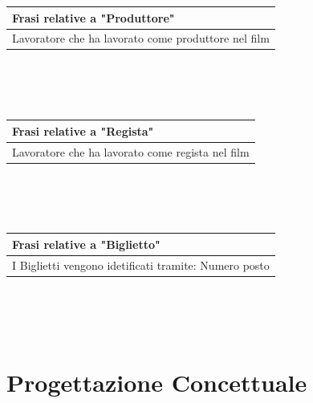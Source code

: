 \documentclass[10pt]{article}
\begin{document}
	\begin{tabular} { |p{16.8cm}| }
		\hline
		\rowcolor{lightgray}
		\textbf{Frasi relative a "Produttore"} \\
		\hline
		Lavoratore che ha lavorato come produttore nel film \\
		\hline 		
	\end{tabular} 
	\\\\\\
	\begin{tabular} { |p{16.8cm}| }
		\hline
		\rowcolor{lightgray}
		\textbf{Frasi relative a "Regista"} \\
		\hline
		Lavoratore che ha lavorato come regista nel film \\
		\hline 		
	\end{tabular} 
	\\\\\\
	\begin{tabular} { |p{16.8cm}| }
		\hline
		\rowcolor{lightgray}
		\textbf{Frasi relative a "Biglietto"} \\
		\hline
		I Biglietti vengono idetificati tramite: Numero posto \\
		\hline 		
	\end{tabular} 
	\\\\\\
	
	
	\section{Progettazione Concettuale}	
\end{document}
